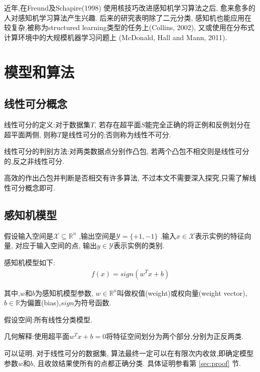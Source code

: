 \documentclass[a4paper,12pt]{article}
\begin{document}
			近年,在Freund及Schapire(1998)
			使用核技巧改进感知机学习算法之后,
			愈来愈多的人对感知机学习算法产生兴趣.
			后来的研究表明除了二元分类,
			感知机也能应用在较复杂,被称为structured learning类型的任务上(Collins, 2002),
			又或使用在分布式计算环境中的大规模机器学习问题上
			(McDonald, Hall and Mann, 2011).
		


	\section{模型和算法}
	
		\subsection{线性可分概念}
			线性可分的定义:对于数据集$T$,
			若存在超平面$S$能完全正确的将正例和反例划分在超平面两侧,
			则称$T$是线性可分的;否则称为线性不可分.

			线性可分的判别方法:对两类数据点分别作凸包,
			若两个凸包不相交则是线性可分的,反之非线性可分.

			高效的作出凸包并判断是否相交有许多算法,
			不过本文不需要深入探究,只需了解线性可分概念即可.

        \subsection{感知机模型}
            假设输入空间是$\mathcal{X} \subseteq \mathbb{R}^n$
            ,输出空间是$ \mathcal{Y} = \{ +1,-1 \}$
            .输入$x\in \mathcal{X}$表示实例的特征向量,
            对应于输入空间的点,
            输出$y\in \mathcal{Y}$表示实例的类别.

            感知机模型如下:
            \begin{eqnarray}
                f(x) = sign(w^T x + b)
			\end{eqnarray}
			
            其中,$w$和$b$为感知机模型参数,
            $w\in \mathbb{R}^n$叫做权值(weight)或权向量(weight vector),
            $b\in \mathbb{R}$为偏置(bias),$sign$为符号函数.

            假设空间:所有线性分类模型.

            几何解释:使用超平面$w^Tx+b=0$将特征空间划分为两个部分,分别为正反两类.

			可以证明,
			对于线性可分的数据集,
			算法最终一定可以在有限次内收敛,即确定模型参数$w$和$b$,
			且收敛结果使所有的点都正确分类.
			具体证明参看第 \ref{sec:proof} 节.
\end{document}
